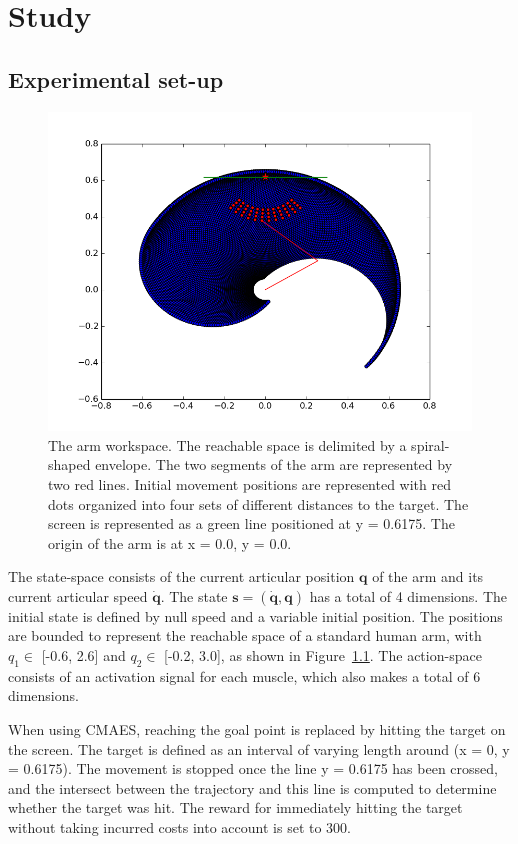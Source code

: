 \documentclass[pdftex,a4paper,12pt]{report}
\begin{document}
\chapter{Study}

\section{Experimental set-up}
\label{sec_ExpSetup}

\begin{figure}[hbt]
\centering
	\includegraphics[width=0.8\columnwidth]{figures/armWorkspace.png}
	\caption{The arm workspace. The reachable space is delimited by a spiral-shaped envelope. The two segments of the arm are represented by two red lines. Initial movement positions are represented with red dots organized into four sets of different distances to the target. The screen is represented as a green line positioned at y = 0.6175. The origin of the arm is at x = 0.0, y = 0.0.}
	\label{fig:arm_workspace}
\end{figure}
\pagebreak
The state-space consists of the current articular position $\textbf{q}$ of the arm and its current articular speed $\boldsymbol{\dot{q}}$. The state $\boldsymbol{s = (\dot{q}, q)}$ has a total of 4 dimensions. The initial state is defined by null speed and a variable initial position.
The positions are bounded to represent the reachable space of a standard human arm, with $q_1 \in$ [-0.6, 2.6] and $q_2 \in$ [-0.2, 3.0], as shown in Figure~\ref{fig:arm_workspace}.
The action-space consists of an activation signal for each muscle, which also makes a total of 6 dimensions.

When using CMAES, reaching the goal point is replaced by hitting the target on the screen. The target is defined as an interval of varying length around (x = 0, y = 0.6175). The movement is stopped once the line y = 0.6175 has been crossed, and the intersect between the trajectory and this line is computed to determine whether the target was hit. The reward for immediately hitting the target without taking incurred costs into account is set to 300.
\end{document}
